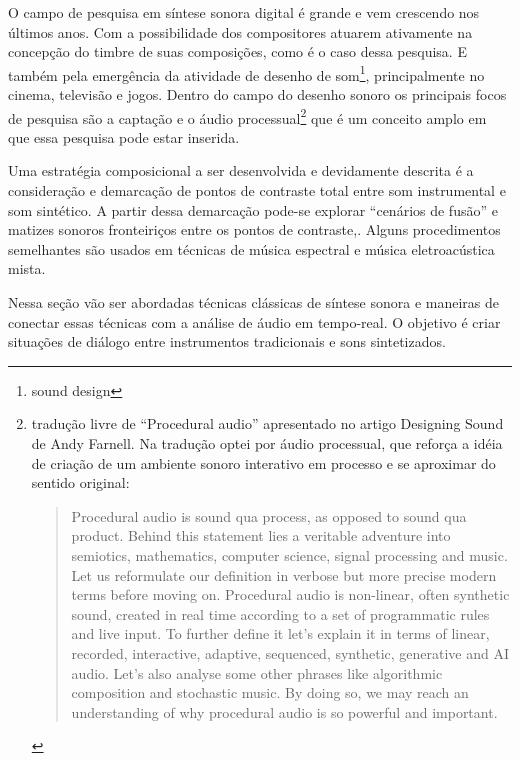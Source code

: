 \documentclass[draft]{ppgmus}
\begin{document}
O campo de pesquisa em síntese sonora digital é grande e vem crescendo
nos últimos anos. Com a possibilidade dos compositores atuarem ativamente
na concepção do timbre de suas composições, como é o caso dessa pesquisa. E
também pela emergência da atividade de desenho  de som\footnote{sound design}, 
principalmente no cinema, televisão e jogos. Dentro do campo do desenho
sonoro os principais focos de pesquisa são a captação e o áudio
processual\footnote{tradução livre de ``Procedural audio'' apresentado no artigo
 Designing Sound de Andy Farnell\cite{farnell2010designing}. Na tradução optei por
áudio processual, que reforça a idéia de criação de um ambiente sonoro interativo
em processo e se aproximar do sentido original:

\begin{quote}
 Procedural audio is sound qua process, as opposed to sound qua product. Behind this statement lies 
a veritable adventure into semiotics, mathematics, computer science, signal processing and music. 
Let us reformulate our definition in verbose but more precise modern terms before moving on. 
Procedural audio is non-linear, often synthetic sound, created in real time according to a set 
of programmatic rules and live input. To further define it let's explain it in terms of linear, 
recorded, interactive, adaptive, sequenced, synthetic, generative and AI audio. 
Let's also analyse some other phrases like algorithmic composition and stochastic music. 
By doing so, we may reach an understanding of why procedural audio is so powerful and important.
\end{quote} 
} que é um conceito amplo em que essa pesquisa pode estar inserida. 

Uma estratégia composicional a ser desenvolvida e devidamente
descrita é a consideração e demarcação de pontos de contraste total
entre som instrumental e som sintético. A partir dessa demarcação pode-se
explorar ``cenários de fusão'' e matizes sonoros fronteiriços entre
os pontos de contraste,. Alguns procedimentos semelhantes são usados
em técnicas de música espectral e música eletroacústica mista.

Nessa seção vão ser abordadas técnicas clássicas de síntese sonora
e maneiras de conectar essas técnicas com a análise
de áudio em tempo-real. O objetivo é criar situações
de diálogo entre instrumentos tradicionais e sons sintetizados.
\end{document}
